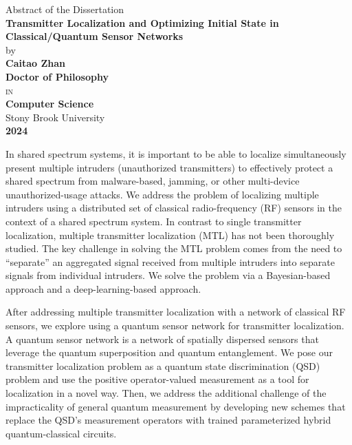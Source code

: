 \begin{center}
    Abstract of the Dissertation  \\
    \vspace{0.2cm}
    \textbf{Transmitter Localization and Optimizing Initial State in Classical/Quantum Sensor Networks}  \\
    \vspace{0.2cm}
    by    \\
    \vspace{0.2cm}
    \textbf{Caitao Zhan}  \\
    \vspace{0.2cm}
    \textbf{Doctor of Philosophy}  \\
    \vspace{0.2cm}
    \textsc{in}  \\
    \vspace{0.2cm}
    \textbf{Computer Science}   \\
    \vspace{0.2cm}
    Stony Brook University    \\
    \vspace{0.2cm}
    \textbf{2024}
\end{center}

In shared spectrum systems, it is important to be able to localize simultaneously present multiple intruders 
(unauthorized transmitters) to effectively protect a shared spectrum from malware-based, jamming, 
or other multi-device unauthorized-usage attacks. We address the problem of localizing multiple intruders using 
a distributed set of classical radio-frequency (RF) sensors in the context of a shared spectrum system. 
In contrast to single transmitter localization, multiple transmitter localization (MTL) has not been thoroughly studied. 
The key challenge in solving the MTL problem comes from the need to “separate” an aggregated signal received from 
multiple intruders into separate signals from individual intruders. We solve the problem via a Bayesian-based approach 
and a deep-learning-based approach. 

After addressing multiple transmitter localization with a network of classical RF sensors, 
we explore using a quantum sensor network for transmitter localization. 
A quantum sensor network is a network of spatially dispersed sensors that leverage the quantum superposition and quantum entanglement. We pose our transmitter localization problem as 
a quantum state discrimination (QSD) problem and use the positive operator-valued measurement as a tool 
for localization in a novel way. Then, we address the additional challenge of the impracticality 
of general quantum measurement by developing new schemes that replace the QSD's measurement operators 
with trained parameterized hybrid quantum-classical circuits. 

